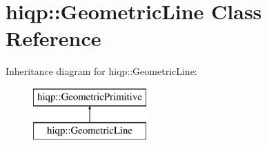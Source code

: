\hypertarget{classhiqp_1_1GeometricLine}{\section{hiqp\-:\-:Geometric\-Line Class Reference}
\label{classhiqp_1_1GeometricLine}
}
Inheritance diagram for hiqp\-:\-:Geometric\-Line\-:\begin{figure}[H]
\begin{center}
\leavevmode
\includegraphics[height=2.000000cm]{classhiqp_1_1GeometricLine}
\end{center}
\end{figure}
